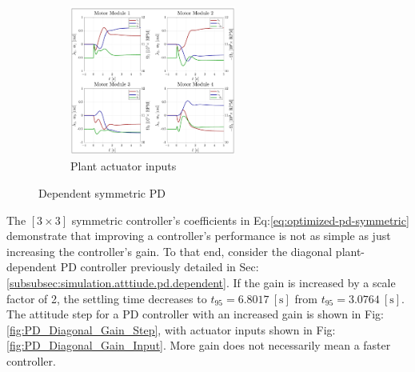 \begin{figure}[htbp]
\begin{subfigure}{0.49\textwidth}
\end{subfigure}
\begin{subfigure}{\textwidth}
\centering
\includegraphics[width=0.6\textwidth]{graphs/PD_Diagonal_Dependent_Input}
\vspace{-8pt}
\caption{Plant actuator inputs}
\label{fig:PD_3x3_Dependent_Input}
\end{subfigure}
\vspace{-8pt}
\caption{Dependent symmetric PD}
\vspace{-26pt}
\end{figure}
\par
The $[3\times 3]$ symmetric controller's coefficients in Eq:\ref{eq:optimized-pd-symmetric} demonstrate that improving a controller's performance is not as simple as just increasing the controller's gain. To that end, consider the diagonal plant-dependent PD controller previously detailed in Sec:\ref{subsubsec:simulation.atttiude.pd.dependent}. If the gain is increased by a scale factor of 2, the settling time decreases to $t_{95}=6.8017~[\text{s}]$ from $t_{95}=3.0764~[\text{s}]$. The attitude step for a PD controller with an increased gain is shown in Fig:\ref{fig:PD_Diagonal_Gain_Step}, with actuator inputs shown in Fig:\ref{fig:PD_Diagonal_Gain_Input}. More gain does not necessarily mean a faster controller.
